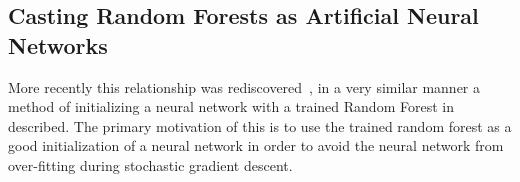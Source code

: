 \documentclass[thesis]{subfiles}
\begin{document}
\subsection{Casting Random Forests as Artificial Neural Networks}
More recently this relationship was rediscovered~\citep{Welbl2014casting}, in a very similar manner a method of initializing a neural network with a trained Random Forest in described. The primary motivation of this is to use the trained random forest as a good initialization of a neural network in order to avoid the neural network from over-fitting during stochastic gradient descent.
\end{document}
